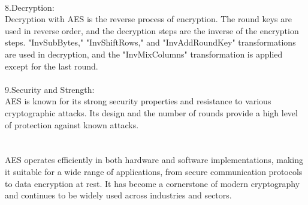 \documentclass{report}
\begin{document}
\\
8.Decryption:\\
Decryption with AES is the reverse process of encryption. The round keys are used in reverse order, and the decryption steps are the inverse of the encryption steps. "InvSubBytes," "InvShiftRows," and "InvAddRoundKey" transformations are used in decryption, and the "InvMixColumns" transformation is applied except for the last round.\\
\\
9.Security and Strength:\\
AES is known for its strong security properties and resistance to various cryptographic attacks. Its design and the number of rounds provide a high level of protection against known attacks.\\
\\
\\
AES operates efficiently in both hardware and software implementations, making it suitable for a wide range of applications, from secure communication protocols to data encryption at rest. It has become a cornerstone of modern cryptography and continues to be widely used across industries and sectors.
\end{document}
